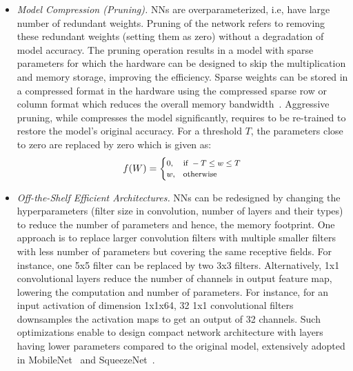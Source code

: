 \begin{itemize}[leftmargin=*]
\item {\em Model Compression (Pruning).} 
NNs are overparameterized, i.e, have large number of redundant weights.
Pruning of the network refers to removing these redundant weights (setting them as zero) without a degradation of model accuracy.
The pruning operation results in a model with sparse parameters for which the hardware can be designed to skip the multiplication and memory storage, improving the efficiency.
Sparse weights can be stored in a compressed format in the hardware using the compressed sparse row or column format which reduces the overall memory bandwidth~\cite{DBLP:journals/corr/HanMD15,10.1109/ISCA.2016.30,Han:2015:LBW:2969239.2969366}.
Aggressive pruning, while compresses the model significantly, requires to be re-trained to restore the model's original accuracy.
For a threshold $T$, the parameters close to zero are replaced by zero which is given as:
\[
\footnotesize
    f(W)=
\begin{cases}
    0, & \text{if } -T \leq w \leq T\\
    w,  & \text{otherwise}
\end{cases}
\]

\item {\em Off-the-Shelf Efficient Architectures.} 
NNs can be redesigned by changing the hyperparameters (filter size in convolution, number of layers and their types) to reduce the number of parameters and hence, the memory footprint.
One approach is to replace larger convolution filters with multiple smaller filters with less number of parameters but covering the same receptive fields.
For instance, one 5x5 filter can be replaced by two 3x3 filters.
Alternatively, 1x1 convolutional layers reduce the number of channels in output feature map, lowering the computation and number of parameters.
For instance, for an input activation of dimension 1x1x64, 32 1x1 convolutional filters downsamples the activation maps to get an output of 32 channels.
Such optimizations enable to design compact network architecture with layers having lower parameters compared to the original model, extensively adopted in MobileNet~\cite{conf/cvpr/SandlerHZZC18} and SqueezeNet~\cite{DBLP:journals/corr/IandolaMAHDK16}.



\end{itemize}

